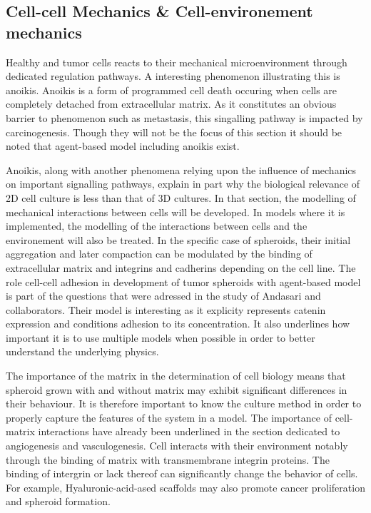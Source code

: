 \documentclass[11pt,a4paper]{article}
\begin{document}

\subsection{Cell-cell Mechanics \& Cell-environement mechanics}
Healthy and tumor cells reacts to their mechanical microenvironment through dedicated regulation pathways. A interesting phenomenon illustrating this is anoikis. Anoikis is a form of programmed cell death occuring when cells are completely detached from extracellular matrix. As it constitutes an obvious barrier to phenomenon such as metastasis, this singalling pathway is impacted by carcinogenesis.\cite{Paoli2013}\cite{Raeisi2022} Though they will not be the focus of this section it should be noted that agent-based model including anoikis exist.\cite{Ingham2017}\cite{Campenni2020}

Anoikis, along with another phenomena relying upon the influence of mechanics on important signalling pathways, explain in part why the biological relevance of 2D cell culture is less than that of 3D cultures. In that section, the modelling of mechanical interactions between cells will be developed. In models where it is implemented, the modelling  of the interactions between cells and the environement will also be treated. In the specific case of spheroids, their initial aggregation and later compaction can be modulated by the binding of extracellular matrix and integrins and cadherins depending on the cell line.\cite{Cui2017} The role cell-cell adhesion in development of tumor spheroids with agent-based model is part of the questions that were  adressed in the study of Andasari and collaborators.\cite{Andasari2012} Their model is interesting as it explicity represents catenin expression and conditions adhesion to its concentration. It also underlines how important it is to use multiple models when possible in order to better understand the underlying physics. 


The importance of the matrix in the determination of cell biology means that spheroid grown with and without matrix may exhibit significant differences in their behaviour. It is therefore important to know the culture method in order to properly capture the features of the system  in a model. The importance of cell-matrix interactions have already been underlined in the section dedicated to angiogenesis and vasculogenesis. Cell interacts with their environment notably through the binding of matrix with transmembrane integrin proteins. The binding of intergrin or lack thereof can significantly change the behavior of cells.\cite{Cui2017} For example, Hyaluronic-acid-ased scaffolds may also promote cancer proliferation and spheroid formation.
\end{document}
